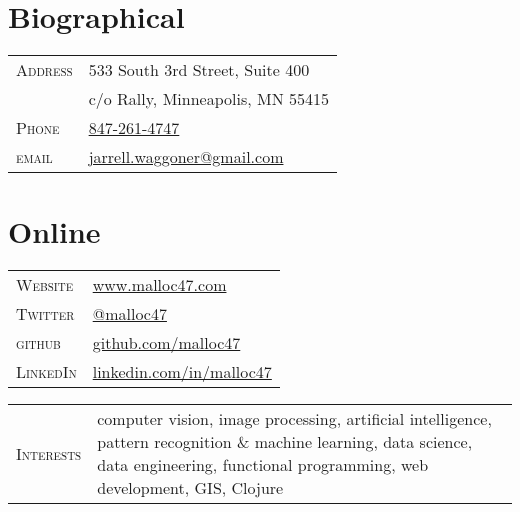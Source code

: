 \documentclass[10pt]{article}
\begin{document}
\pagestyle{empty}

\par{\bigskip\par}

\begin{multicols}{2}
\setlength{\parskip}{0pt}
\section{Biographical}

\begin{tabularx}{\linewidth}{@{}l X@{}}
  \textsc{Address} & \small{533 South 3rd Street, Suite 400} \\
                   & \small{c/o Rally, Minneapolis, MN 55415} \\
  \textsc{Phone}   & \href{tel:847-261-4747}{847-261-4747}\\
  \textsc{email}   & \href{mailto:jarrell.waggoner@gmail.com}{jarrell.waggoner@gmail.com} \\
\end{tabularx}

\vfill
\columnbreak

\section{Online}
\begin{tabularx}{\linewidth}{@{}l X@{}}
  \textsc{Website}	& \href{http://www.malloc47.com}{www.malloc47.com} \\
  \textsc{Twitter}     & \href{https://twitter.com/malloc47}{@malloc47} \\
  \textsc{github}      & \href{http://www.github.com/malloc47}{github.com/malloc47}\\
  \textsc{LinkedIn}    & \href{http://www.linkedin.com/in/malloc47}{linkedin.com/in/malloc47} \\
\end{tabularx}

\end{multicols}

\begin{tabularx}{\textwidth}{@{}l X}
  \textsc{Interests} & computer vision, image processing, artificial
  intelligence, pattern recognition \& machine learning, data science,
  data engineering, functional programming, web development, GIS,
  Clojure
\end{tabularx}

\newcommand{\degree}[4]{\textsc{#1} & \textbf{#2} & \textsc{#3} & \textbf{#4}\\}
\end{document}
